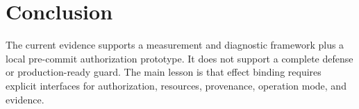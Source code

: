 \section{Conclusion}
The current evidence supports a measurement and diagnostic framework plus a local pre-commit authorization prototype. It does not support a complete defense or production-ready guard. The main lesson is that effect binding requires explicit interfaces for authorization, resources, provenance, operation mode, and evidence.
